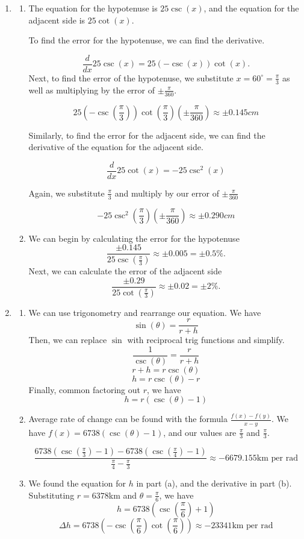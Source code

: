 \documentclass[11pt, letterpaper, twoside]{article}
\begin{document}
\begin{enumerate}
\item \begin{enumerate}[label=(\alph*)]
\item The equation for the hypotenuse is \(25\csc(x)\), and the equation for the adjacent side is \(25\cot(x)\).
\vspace{1mm}

To find the error for the hypotenuse, we can find the derivative.

\[\frac{d}{dx}25\csc(x)=25(-\csc(x))\cot(x).\] Next, to find the error of the hypotenuse, we substitute \(x=60^\circ=\frac{\pi}{3}\) as well as multiplying by the error of \(\pm\frac{\pi}{360}\).

\[25(-\csc\left(\frac{\pi}{3}\right))\cot\left(\frac{\pi}{3}\right)\left(\pm\frac{\pi}{360}\right)\approx\pm0.145cm\]

Similarly, to find the error for the adjacent side, we can find the derivative of the equation for the adjacent side.

\[\frac{d}{dx}25\cot(x)=-25\csc^2(x)\]

Again, we substitute \(\frac{\pi}{3}\) and multiply by our error of \(\pm\frac{\pi}{360}\)

\[-25\csc^2\left(\frac{\pi}{3}\right)\left(\pm\frac{\pi}{360}\right)\approx\pm0.290cm\]
\item We can begin by calculating the error for the hypotenuse
\[\frac{\pm0.145}{25\csc\left(\frac{\pi}{3}\right)}\approx\pm0.005=\pm0.5\%.\]
Next, we can calculate the error of the adjacent side
\[\frac{\pm0.29}{25\cot\left(\frac{\pi}{3}\right)}\approx\pm0.02=\pm2\%.\]
\end{enumerate}
\item \begin{enumerate}[label=(\alph*)]
\item We can use trigonometry and rearrange our equation. We have
\[\sin(\theta)=\frac{r}{r+h}\]
Then, we can replace \(\sin\) with reciprocal trig functions and simplify.
\[\frac{1}{\csc(\theta)}=\frac{r}{r+h}\]
\[r+h=r\csc(\theta)\]
\[h=r\csc(\theta)-r\]
Finally, common factoring out \(r\), we have
\[h=r(\csc(\theta)-1)\]
\item Average rate of change can be found with the formula \(\frac{f(x)-f(y)}{x-y}\). We have \(f(x)=6738(\csc(\theta)-1)\), and our values are \(\frac{\pi}{3}\) and \(\frac{\pi}{3}\).

\[\frac{6738(\csc(\frac{\pi}{3})-1)-6738(\csc(\frac{\pi}{4})-1)}{\frac{\pi}{4}-\frac{\pi}{3}}\approx-6679.155 \text{km per rad} \]
\item We found the equation for \(h\) in part (a), and the derivative in part (b). Substituting \(r=6378\)km and \(\theta=\frac{\pi}{6}\), we have 
\[h=6738(\csc\left(\frac{\pi}{6}\right)+1)\]
\[\Delta h = 6738(-\csc\left(\frac{\pi}{6}\right)\cot\left(\frac{\pi}{6}\right))\approx -23341\text{km per}\text{ rad}\] 
\end{enumerate}
\end{enumerate}
\end{document}
